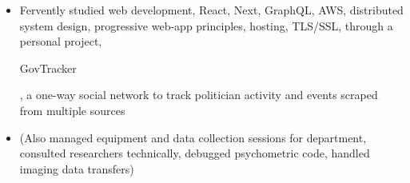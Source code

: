 \documentclass[10pt,a4paper,ragged2e]{altacv}
\begin{document}
\begin{itemize}[label={},noitemsep]
    \item Fervently studied web development, React, Next, GraphQL, AWS, distributed system design, progressive web-app principles, hosting, TLS/SSL, through a personal project, \begin{it}GovTracker\end{it}, a one-way social network to track politician activity and events scraped from multiple sources
    \item (Also managed equipment and data collection sessions for department, consulted researchers technically, debugged psychometric code, handled imaging data transfers)
\end{itemize}







\end{document}
